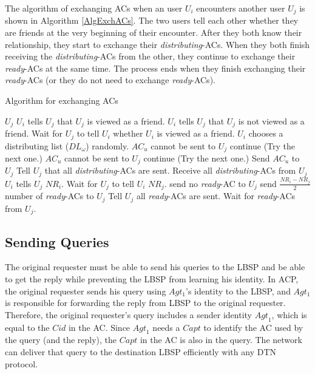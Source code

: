The algorithm of exchanging ACs when an user $U_i$ encounters another user $U_j$ is shown in Algorithm \ref{AlgExchACs}. The two users tell each other whether they are friends at the very beginning of their encounter. After they both know their relationship, they start to exchange their \textit{distributing}-ACs. When they both finish receiving the \textit{distributing}-ACs from the other, they continue to exchange their \textit{ready}-ACs at the same time. The process ends when they finish exchanging their \textit{ready}-ACs (or they do not need to exchange \textit{ready}-ACs).

\begin{algorithm} [hbtp]
\caption{Algorithm for exchanging ACs}\label{AlgExchACs}
\begin{algorithmic}[1]
 {$U_j$}
\State $U_i$ tells $U_j$ that $U_j$ is viewed as a friend.
\Else
\State $U_i$ tells $U_j$ that $U_j$ is not viewed as a friend.
\EndIf
\State Wait for $U_j$ to tell $U_i$ whether $U_i$ is viewed as a friend.
\State $U_i$ chooses a distributing list (${DL}_{\omega}$) randomly.
\State ${AC}_u$ cannot be sent to $U_j$
\State continue (Try the next one.)
\EndIf
{}
\State ${AC}_u$ cannot be sent to $U_j$
\State continue (Try the next one.)
\EndIf
\EndIf
\State Send ${AC}_u$ to $U_j$
\EndFor
\State Tell $U_j$ that all \textit{distributing}-ACs are sent.
\State Receive all \textit{distributing}-ACs from $U_j$
\State $U_i$ tells $U_j$ ${NR}_i$.
\EndIf
{}
\State Wait for $U_j$ to tell $U_i$ ${NR}_j$.
\State send no \textit{ready}-AC to $U_j$
\Else
\State send $\frac{{NR}_i-{NR}_j}{2}$ number of \textit{ready}-ACs to $U_j$
\EndIf
\State Tell $U_j$ all \textit{ready}-ACs are sent.
\EndIf
{}
\State Wait for \textit{ready}-ACs from $U_j$.
\EndIf 
\EndProcedure

\end{algorithmic}
\end{algorithm}

\subsection{Sending Queries}

\noindent The original requester must be able to send his queries to the LBSP and be able to get the reply while preventing the LBSP from learning his identity. In ACP, the original requester sends his query using $Agt_1$'s identity to the LBSP, and $Agt_1$ is responsible for forwarding the reply from LBSP to the original requester. Therefore, the original requester's query includes a sender identity ${Agt}_1$, which is equal to the $Cid$ in the AC. Since ${Agt}_1$ needs a ${Capt}$ to identify the AC used by the query (and the reply), the ${Capt}$ in the AC is also in the query. The network can deliver that query to the destination LBSP efficiently with any DTN protocol.

